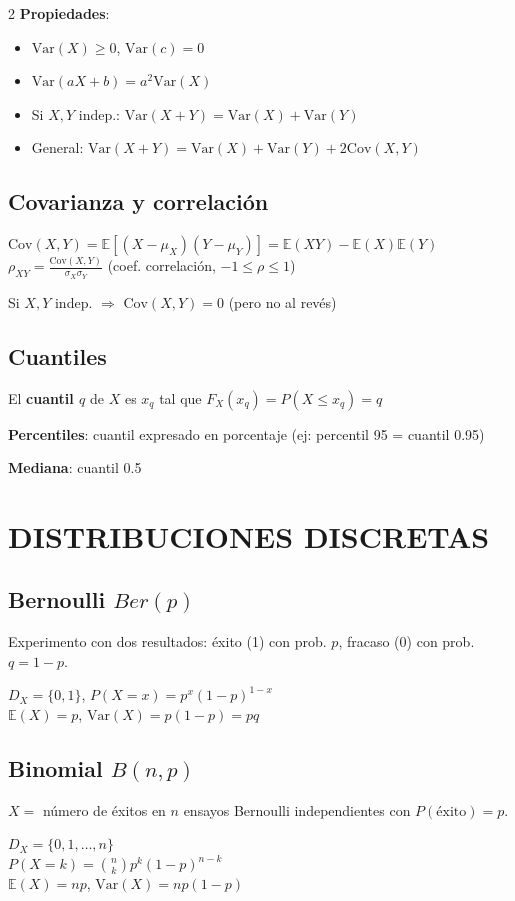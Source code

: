 \documentclass[9pt,a4paper]{article}
\newcommand{\E}{\mathbb{E}}
\newcommand{\Var}{\text{Var}}
\newcommand{\Cov}{\text{Cov}}
\begin{document}
\begin{multicols}{2}
\textbf{Propiedades}:
\begin{itemize}[leftmargin=*]
\item $\Var(X)\geq 0$, \quad $\Var(c)=0$
\item $\Var(aX+b)=a^2\Var(X)$
\item Si $X,Y$ indep.: $\Var(X+Y)=\Var(X)+\Var(Y)$
\item General: $\Var(X+Y)=\Var(X)+\Var(Y)+2\Cov(X,Y)$
\end{itemize}

\subsection{Covarianza y correlación}
\begin{formulabox}
$\Cov(X,Y)=\E[(X-\mu_X)(Y-\mu_Y)]=\E(XY)-\E(X)\E(Y)$\\[3pt]
$\rho_{XY}=\frac{\Cov(X,Y)}{\sigma_X\sigma_Y}$ \quad (coef. correlación, $-1\leq\rho\leq 1$)
\end{formulabox}

Si $X,Y$ indep. $\Rightarrow$ $\Cov(X,Y)=0$ (pero no al revés)

\subsection{Cuantiles}
El \textbf{cuantil $q$} de $X$ es $x_q$ tal que $F_X(x_q)=P(X\leq x_q)=q$

\textbf{Percentiles}: cuantil expresado en porcentaje (ej: percentil 95 = cuantil 0.95)

\textbf{Mediana}: cuantil 0.5

\section{DISTRIBUCIONES DISCRETAS}

\subsection{Bernoulli $Ber(p)$}
Experimento con dos resultados: éxito (1) con prob. $p$, fracaso (0) con prob. $q=1-p$.
\begin{formulabox}
$D_X=\{0,1\}$, \quad $P(X=x)=p^x(1-p)^{1-x}$\\
$\E(X)=p$, \quad $\Var(X)=p(1-p)=pq$
\end{formulabox}

\subsection{Binomial $B(n,p)$}
$X=$ número de éxitos en $n$ ensayos Bernoulli independientes con $P(\text{éxito})=p$.
\begin{formulabox}
$D_X=\{0,1,\ldots,n\}$\\
$P(X=k)=\binom{n}{k}p^k(1-p)^{n-k}$\\
$\E(X)=np$, \quad $\Var(X)=np(1-p)$
\end{formulabox}


\end{multicols}
\end{document}
